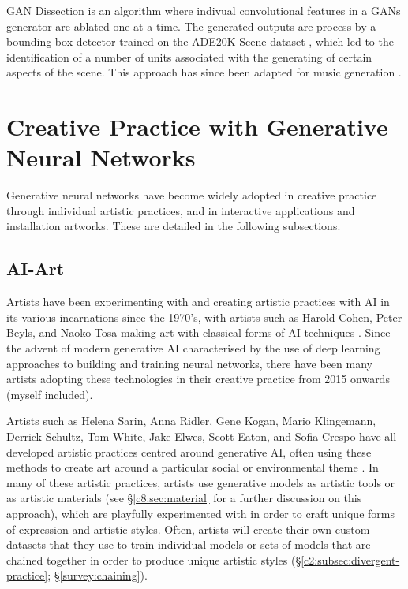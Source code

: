 GAN Dissection \citep{Bau2018-td} is an algorithm where indivual convolutional features in a GANs generator are ablated one at a time.
The generated outputs are process by a bounding box detector trained on the ADE20K Scene dataset \citep{zhou2017scene}, which led to the identification of a number of units associated with the generating of certain aspects of the scene. 
This approach has since been adapted for music generation \citep{Brink2019-gc}. 

\section{Creative Practice with Generative Neural Networks}

Generative neural networks have become widely adopted in creative practice through individual artistic practices, and in interactive applications and installation artworks. 
These are detailed in the following subsections.

\subsection{AI-Art} 

Artists have been experimenting with and creating artistic practices with AI in its various incarnations since the 1970's, with artists such as Harold Cohen, Peter Beyls, and Naoko Tosa making art with classical forms of AI techniques \citep{grba2022deep}. 
Since the advent of modern generative AI characterised by the use of deep learning approaches to building and training neural networks, there have been many artists adopting these technologies in their creative practice from 2015 onwards (myself included). 

Artists such as Helena Sarin, Anna Ridler, Gene Kogan, Mario Klingemann, Derrick Schultz, Tom White, Jake Elwes, Scott Eaton, and Sofia Crespo have all developed artistic practices centred around generative AI, often using these methods to create art around a particular social or environmental theme \citep{grba2022deep}. 
In many of these artistic practices, artists use generative models as artistic tools or as artistic materials (see \S \ref{c8:sec:material} for a further discussion on this approach), which are playfully experimented with in order to craft unique forms of expression and artistic styles.
Often, artists will create their own custom datasets that they use to train individual models or sets of models that are chained together in order to produce unique artistic styles (\S \ref{c2:subsec:divergent-practice}; \S \ref{survey:chaining}).

